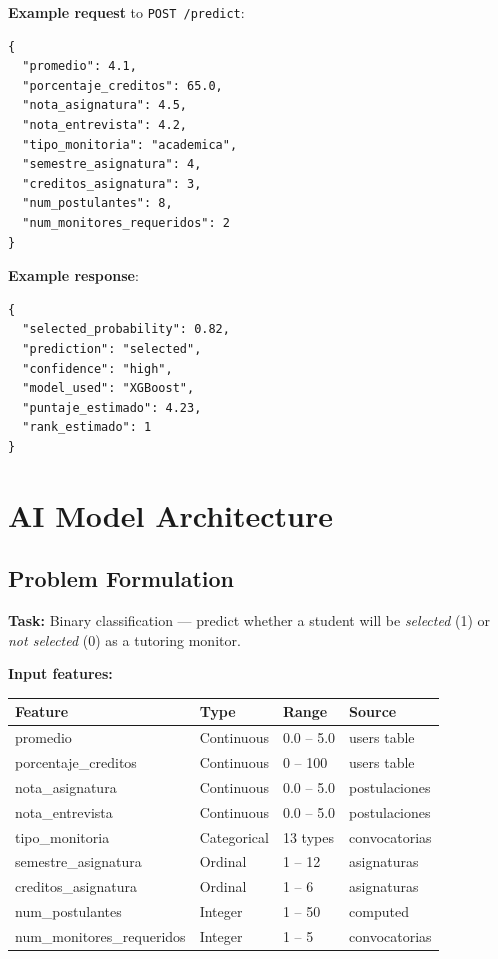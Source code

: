 \documentclass[12pt,a4paper]{article}
\newcommand{\ep}[1]{\texttt{\color{grisusco}#1}}
\begin{document}
\noindent\textbf{Example request} to \ep{POST /predict}:
\begin{verbatim}
{
  "promedio": 4.1,
  "porcentaje_creditos": 65.0,
  "nota_asignatura": 4.5,
  "nota_entrevista": 4.2,
  "tipo_monitoria": "academica",
  "semestre_asignatura": 4,
  "creditos_asignatura": 3,
  "num_postulantes": 8,
  "num_monitores_requeridos": 2
}
\end{verbatim}

\noindent\textbf{Example response}:
\begin{verbatim}
{
  "selected_probability": 0.82,
  "prediction": "selected",
  "confidence": "high",
  "model_used": "XGBoost",
  "puntaje_estimado": 4.23,
  "rank_estimado": 1
}
\end{verbatim}

\section{AI Model Architecture}

\subsection{Problem Formulation}
\textbf{Task:} Binary classification — predict whether a student will be \textit{selected}
(1) or \textit{not selected} (0) as a tutoring monitor.

\textbf{Input features:}
\begin{center}
\begin{tabular}{llll}
  \toprule
  \textbf{Feature} & \textbf{Type} & \textbf{Range} & \textbf{Source} \\
  \midrule
  promedio & Continuous & 0.0 – 5.0 & users table \\
  porcentaje\_creditos & Continuous & 0 – 100 & users table \\
  nota\_asignatura & Continuous & 0.0 – 5.0 & postulaciones \\
  nota\_entrevista & Continuous & 0.0 – 5.0 & postulaciones \\
  tipo\_monitoria & Categorical & 13 types & convocatorias \\
  semestre\_asignatura & Ordinal & 1 – 12 & asignaturas \\
  creditos\_asignatura & Ordinal & 1 – 6 & asignaturas \\
  num\_postulantes & Integer & 1 – 50 & computed \\
  num\_monitores\_requeridos & Integer & 1 – 5 & convocatorias \\
  \bottomrule
\end{tabular}
\end{center}
\end{document}
